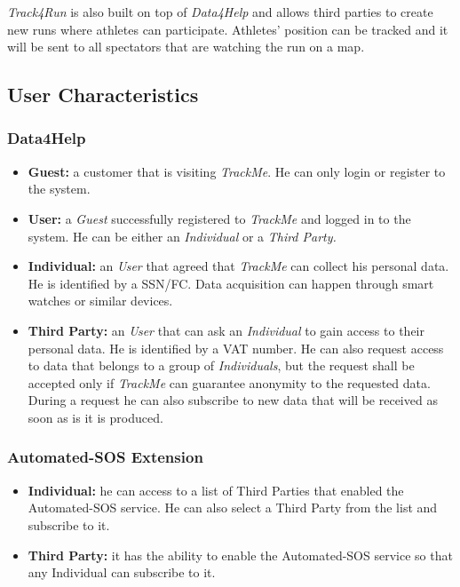 \documentclass[a4paper]{article}
\begin{document}
    \textit{Track4Run} is also built on top of \textit{Data4Help} and allows third parties to create new runs where athletes can participate. Athletes' position can be tracked and it will be sent to all spectators that are watching the run on a map.
    
    \subsection{User Characteristics}
        \subsubsection{Data4Help}
        \begin{itemize}
            \item \textbf{Guest:} a customer that is visiting \textit{TrackMe}. He can only login or register to the system.
            \item \textbf{User:} a \textit{Guest} successfully registered to \textit{TrackMe} and logged in to the system. He can be either an \textit{Individual} or a \textit{Third Party.}
            \item \textbf{Individual:} an \textit{User} that agreed that \textit{TrackMe} can collect his personal data. He is identified by a SSN/FC. Data acquisition can happen through smart watches or similar devices.
            \item \textbf{Third Party:} an \textit{User} that can ask an \textit{Individual} to gain access to their personal data. He is identified by a VAT number. He can also request access to data that belongs to a group of \textit{Individuals}, but the request shall be accepted only if \textit{TrackMe} can guarantee anonymity to the requested data. During a request he can also subscribe to new data that will be received as soon as is it is produced.
        \end{itemize}

        \subsubsection{Automated-SOS Extension}
        \begin{itemize}
            \item \textbf{Individual:} he can access to a list of Third Parties that enabled the Automated-SOS service. He can also select a Third Party from the list and subscribe to it.
            \item \textbf{Third Party:} it has the ability to enable the Automated-SOS service so that any Individual can subscribe to it.
        \end{itemize}
        
\end{document}
